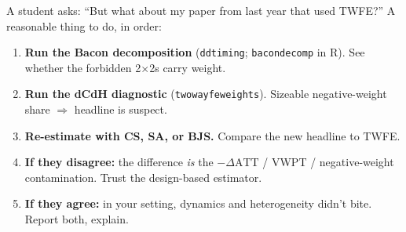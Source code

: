 \documentclass[aspectratio=169,11pt]{beamer}
\begin{document}
\begin{frame}{A student asks: ``But what about my paper from last year that used TWFE?''}
\vspace{0.4em}
A reasonable thing to do, in order:

\vspace{0.5em}
\begin{enumerate}\small
  \item \textbf{Run the Bacon decomposition} (\texttt{ddtiming}; \texttt{bacondecomp} in R). \;See whether the forbidden 2$\times$2s carry weight.
  \item \textbf{Run the dCdH diagnostic} (\texttt{twowayfeweights}). \;Sizeable negative-weight share $\Rightarrow$ headline is suspect.
  \item \textbf{Re-estimate with CS, SA, or BJS.} \;Compare the new headline to TWFE.
  \item \textbf{If they disagree:} \;the difference \textit{is} the $-\Delta\text{ATT}$ / VWPT / negative-weight contamination. Trust the design-based estimator.
  \item \textbf{If they agree:} \;in your setting, dynamics and heterogeneity didn't bite. \;Report both, explain.
\end{enumerate}
\end{frame}
\end{document}
